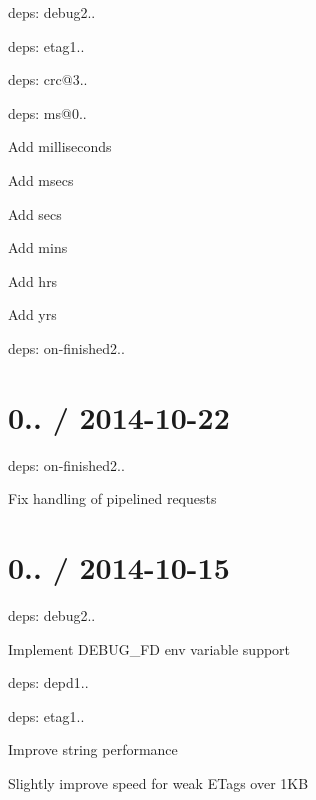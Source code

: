 \begin{DoxyItemize}
\item deps\+: debug2..
\item deps\+: etag1..
\begin{DoxyItemize}
\item deps\+: crc@3..
\end{DoxyItemize}
\item deps\+: ms@0..
\begin{DoxyItemize}
\item Add {\ttfamily milliseconds}
\item Add {\ttfamily msecs}
\item Add {\ttfamily secs}
\item Add {\ttfamily mins}
\item Add {\ttfamily hrs}
\item Add {\ttfamily yrs}
\end{DoxyItemize}
\item deps\+: on-\/finished2..
\end{DoxyItemize}

\section*{0.. / 2014-\/10-\/22 }


\begin{DoxyItemize}
\item deps\+: on-\/finished2..
\begin{DoxyItemize}
\item Fix handling of pipelined requests
\end{DoxyItemize}
\end{DoxyItemize}

\section*{0.. / 2014-\/10-\/15 }


\begin{DoxyItemize}
\item deps\+: debug2..
\begin{DoxyItemize}
\item Implement {\ttfamily D\+E\+B\+U\+G\+\_\+\+F\+D} env variable support
\end{DoxyItemize}
\item deps\+: depd1..
\item deps\+: etag1..
\begin{DoxyItemize}
\item Improve string performance
\item Slightly improve speed for weak E\+Tags over 1\+K\+B
\end{DoxyItemize}
\end{DoxyItemize}

